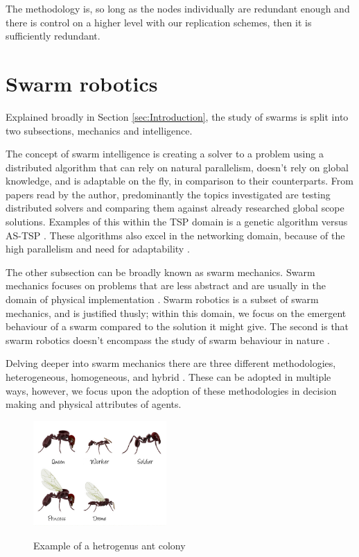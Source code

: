 \documentclass{UoYCSproject}
\begin{document}
The methodology is, so long as the nodes individually are redundant enough and there is control on a higher level with our replication schemes, then it is sufficiently redundant.



\section{Swarm robotics}
\label{sec:Robotics}

Explained broadly in Section \ref{sec:Introduction}, the study of swarms is split into two subsections, mechanics and intelligence.

The concept of swarm intelligence is creating a solver to a problem using a distributed algorithm that can rely on natural parallelism, doesn't rely on global knowledge, and is adaptable on the fly, in comparison to their counterparts.
From papers read by the author, predominantly the topics investigated are testing distributed solvers and comparing them against already researched global scope solutions.
Examples of this within the TSP domain is a genetic algorithm versus AS-TSP \cite{Swarm intellegiegence}.
These algorithms also excel in the networking domain, because of the high parallelism and need for adaptability \cite{Swarm intellegiegence}.

The other subsection can be broadly known as swarm mechanics.
Swarm mechanics focuses on problems that are less abstract and are usually in the domain of physical implementation \cite{Cognitive maps mine detection, Probabalitic automata foraging robots}.
Swarm robotics is a subset of swarm mechanics, and is justified thusly; within this domain, we focus on the emergent behaviour of a swarm compared to the solution it might give.
The second is that swarm robotics doesn’t encompass the study of swarm behaviour in nature \cite{Swarm intellegiegence, Ant communication}.

Delving deeper into swarm mechanics there are three different methodologies, heterogeneous, homogeneous, and hybrid \cite{Swarm robotics reviewed}.
These can be adopted in multiple ways, however, we focus upon the adoption of these methodologies in decision making and physical attributes of agents.

\begin{figure}[htb]
\begin{center}
\label{fig:anthero}
\includegraphics[height=4cm]{"./ExplanationImgs/AntHetro.png"}
\end{center}
\caption{Example of a hetrogenus ant colony}
\end{figure}
\end{document}
